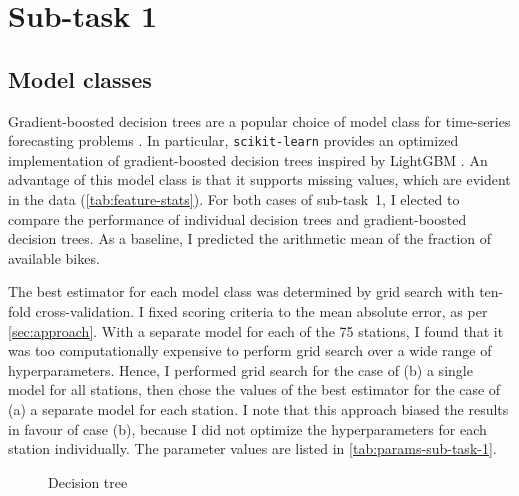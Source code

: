 \section{Sub-task 1}
\label{sec:sub-task-1}

\subsection{Model classes}
\label{sec:sub-task-1:model-classes}

Gradient-boosted decision trees are a popular choice of model class for time-series
forecasting problems \parencite{Bojer2021}.
In particular, \texttt{scikit-learn} provides an optimized implementation of
gradient-boosted decision trees inspired by LightGBM \parencite{Ke2017}.
An advantage of this model class is that it supports missing values, which are evident
in the data (\cref{tab:feature-stats}).
For both cases of sub-task~1, I elected to compare the performance of individual
decision trees and gradient-boosted decision trees.
As a baseline, I predicted the arithmetic mean of the fraction of available bikes.

The best estimator for each model class was determined by grid search with ten-fold
cross-validation.
I fixed scoring criteria to the mean absolute error, as per \cref{sec:approach}.
With a separate model for each of the 75 stations, I found that it was too
computationally expensive to perform grid search over a wide range of hyperparameters.
Hence, I performed grid search for the case of (b) a single model for all stations,
then chose the values of the best estimator for the case of (a) a separate model for
each station.
I note that this approach biased the results in favour of case (b), because I did not
optimize the hyperparameters for each station individually.
The parameter values are listed in \cref{tab:params-sub-task-1}.

\begin{table}
  \centering
  \begin{subfigure}{\textwidth}
    \centering
    \caption{Decision tree}
    \label{tab:params-sub-task-1-1}
  \end{subfigure}
  \subfigurespace
  \begin{subfigure}{\textwidth}
    \centering
    
    \label{tab:params-sub-task-1-2}
  \end{subfigure}
  \caption{The parameter values over which I performed grid search.
    Except where stated, the default values were used, and the parameters of the best
    estimator are underlined.
    For a description of the parameters and their default values, see
     and
    .
  }
  \label{tab:params-sub-task-1}
\end{table}

